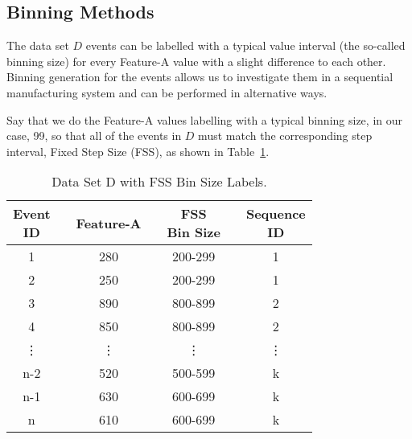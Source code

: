 \subsection*{Binning Methods}
%

The data set $D$ events can be labelled with a typical value interval (the so-called binning size) for every Feature-A value with a slight difference to each other. Binning generation for the events allows us to investigate them in a {\color{red}sequential manufacturing system} and can be performed in alternative ways.

Say that we do the Feature-A values labelling with a typical binning size, in our case, 99, so that all of the events in $D$ must match the corresponding step interval, Fixed Step Size (FSS), as shown in Table~\ref{Tab: D-dataset-FSS}. 
\begin{table}[hb!]
	\centering
	\setlength{\arrayrulewidth}{0.75pt}%
	\begin{tabular}{|cc|c|ccc|c|}
		\hline \rowcolor[HTML]{FFFFC7}
		\makecell{Event\\ID} 	&& Feature-A    	&& \makecell{FSS\\Bin Size}&& \makecell{Sequence\\ID}  \\ \hline
		1 	      && 280	    && 200-299	&& 1 		     \\
		2 		  && 250	    && 200-299	&& 1 		     \\
		3 	      && 890	    && 800-899	&& 2 		     \\
		4 		  && 850	    && 800-899	&& 2 		     \\
		\vdots	  && \vdots  	&& \vdots	&& \vdots 	     \\
		n-2 	  && 520	    && 500-599	&& k 		     \\
		n-1       && 630	    && 600-699	&& k 		     \\
		n 		  && 610	    && 600-699	&& k 		     \\ \hline
	\end{tabular}
	\caption{Data Set D with FSS Bin Size Labels.}
	\label{Tab: D-dataset-FSS}
\end{table}

